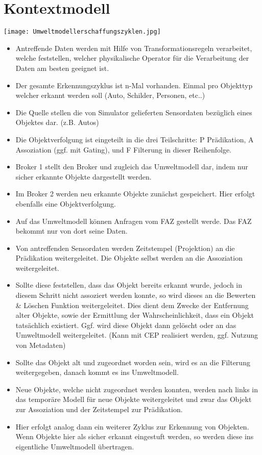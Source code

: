 \documentclass[pdftex,a4paper]{scrartcl}
\begin{document}
\section{Kontextmodell}
\texttt{[image: Umweltmodellerschaffungszyklen.jpg]}
\begin{itemize}
	\item Antreffende Daten werden mit Hilfe von Transformationsregeln verarbeitet, welche feststellen, welcher physikalische Operator f\"ur die Verarbeitung der Daten am besten geeignet ist.
	\item Der gesamte Erkennungszyklus ist n-Mal vorhanden. Einmal pro Objekttyp welcher erkannt werden soll (Auto, Schilder, Personen, etc..)
	\item Die Quelle stellen die von Simulator gelieferten Sensordaten bez\"uglich eines Objektes dar. (z.B. Autos)
	\item Die Objektverfolgung ist eingeteilt in die drei Teilschritte: P Pr\"adikation, A Assoziation (ggf. mit Gating), und F Filterung in dieser Reihenfolge.
	\item Broker 1 stellt den Broker und zugleich das Umweltmodell dar, indem nur sicher erkannte Objekte dargestellt werden.
	\item Im Broker 2 werden neu erkannte Objekte zun\"achst gespeichert. Hier erfolgt ebenfalls eine Objektverfolgung.
	\item Auf das Umweltmodell k\"onnen Anfragen vom FAZ gestellt werde. Das FAZ bekommt nur von dort seine Daten.
\end{itemize}	

\begin{itemize}
 
\item Von antreffenden Sensordaten werden Zeitstempel (Projektion) an die Pr\"adikation weitergeleitet. Die Objekte selbst werden an die Assoziation weitergeleitet. 
\item Sollte diese feststellen, dass das Objekt bereits erkannt wurde, jedoch in diesem Schritt nicht assoziert werden konnte, so wird dieses an die Bewerten \& L\"oschen Funktion weitergeleitet. Dies dient dem Zwecke der Entfernung alter Objekte, sowie der Ermittlung der Wahrscheinlichkeit, dass ein Objekt tats\"achlich existiert. Ggf. wird diese Objekt dann gel\"oscht oder an das Umweltmodell weitergeleitet. (Kann mit CEP realisiert werden, ggf. Nutzung von Metadaten)
 \item Sollte das Objekt alt und zugeordnet worden sein, wird es an die Filterung weitergegeben, danach kommt es ins Umweltmodell.
 \item Neue Objekte, welche nicht zugeordnet werden konnten, werden nach links in das tempor\"are Modell f\"ur neue Objekte  weitergeleitet und zwar das Objekt zur Assoziation und der Zeitstempel zur Pr\"adikation. 
\item Hier erfolgt analog dann ein weiterer Zyklus zur Erkennung von Objekten. Wenn Objekte hier als sicher erkannt eingestuft werden, so werden diese ins eigentliche Umweltmodell \"ubertragen.
\end{itemize}
\end{document}
